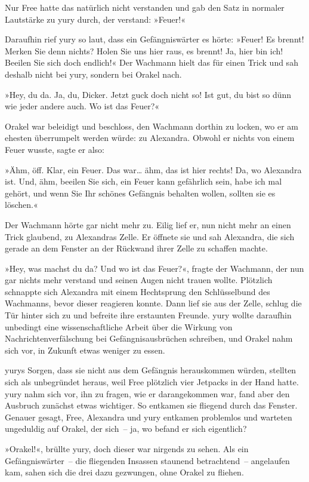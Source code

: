 Nur Free hatte das natürlich nicht verstanden und gab den Satz in normaler Lautstärke zu yury durch, der verstand: »Feuer!«

Daraufhin rief yury so laut, dass ein Gefängniswärter es hörte: »Feuer! Es brennt! Merken Sie denn nichts? Holen Sie uns hier raus, es brennt! Ja, hier bin ich! Beeilen Sie sich doch endlich!« Der Wachmann hielt das für einen Trick und sah deshalb nicht bei yury, sondern bei Orakel nach.

»Hey, du da. Ja, du, Dicker. Jetzt guck doch nicht so! Ist gut, du bist so dünn wie jeder andere auch. Wo ist das Feuer?«

Orakel war beleidigt und beschloss, den Wachmann dorthin zu locken, wo er am ehesten überrumpelt werden würde: zu Alexandra. Obwohl er nichts von einem Feuer wusste, sagte er also:

»Ähm, öff. Klar, ein Feuer. Das war… ähm, das ist hier rechts! Da, wo Alexandra ist. Und, ähm, beeilen Sie sich, ein Feuer kann gefährlich sein, habe ich mal gehört, und wenn Sie Ihr schönes Gefängnis behalten wollen, sollten sie es löschen.«

Der Wachmann hörte gar nicht mehr zu. Eilig lief er, nun nicht mehr an einen Trick glaubend, zu Alexandras Zelle. Er öffnete sie und sah Alexandra, die sich gerade an dem Fenster an der Rückwand ihrer Zelle zu schaffen machte.

»Hey, was machst du da? Und wo ist das Feuer?«, fragte der Wachmann, der nun gar nichts mehr verstand und seinen Augen nicht trauen wollte. Plötzlich schnappte sich Alexandra mit einem Hechtsprung den Schlüsselbund des Wachmanns, bevor dieser reagieren konnte. Dann lief sie aus der Zelle, schlug die Tür hinter sich zu und befreite ihre erstaunten Freunde. yury wollte daraufhin unbedingt eine wissenschaftliche Arbeit über die Wirkung von Nachrichtenverfälschung bei Gefängnisausbrüchen schreiben, und Orakel nahm sich vor, in Zukunft etwas weniger zu essen.

yurys Sorgen, dass sie nicht aus dem Gefängnis herauskommen würden, stellten sich als unbegründet heraus, weil Free plötzlich vier Jetpacks in der Hand hatte. yury nahm sich vor, ihn zu fragen, wie er darangekommen war, fand aber den Ausbruch zunächst etwas wichtiger. So entkamen sie fliegend durch das Fenster. Genauer gesagt, Free, Alexandra und yury entkamen problemlos und warteten ungeduldig auf Orakel, der sich~– ja, wo befand er sich eigentlich?

»Orakel!«, brüllte yury, doch dieser war nirgends zu sehen. Als ein Gefängniswärter~– die fliegenden Insassen staunend betrachtend~– angelaufen kam, sahen sich die drei dazu gezwungen, ohne Orakel zu fliehen.


